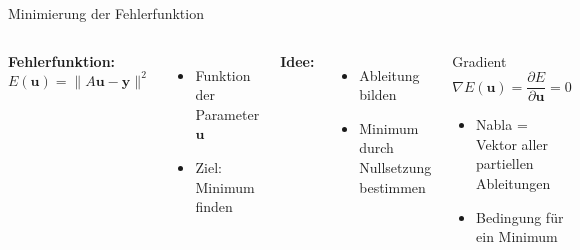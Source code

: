 \begin{frame}{Minimierung der Fehlerfunktion}

\begin{columns}


\textbf{Fehlerfunktion:}
\[
E(\mathbf{u}) = \|A\mathbf{u} - \mathbf{y}\|^2
\]

\medskip

\begin{itemize}
\item Funktion der Parameter $\mathbf{u}$
\item Ziel: Minimum finden
\end{itemize}

\medskip

\textbf{Idee:}
\begin{itemize}
\item Ableitung bilden
\item Minimum durch Nullsetzung bestimmen
\end{itemize}


\begin{block}{Gradient}
\[
\nabla E(\mathbf{u}) = \frac{\partial E}{\partial \mathbf{u}} = 0
\]

\medskip

\begin{itemize}
\item Nabla = Vektor aller partiellen Ableitungen
\item Bedingung für ein Minimum
\end{itemize}
\end{block}

\end{columns}

\end{frame}

